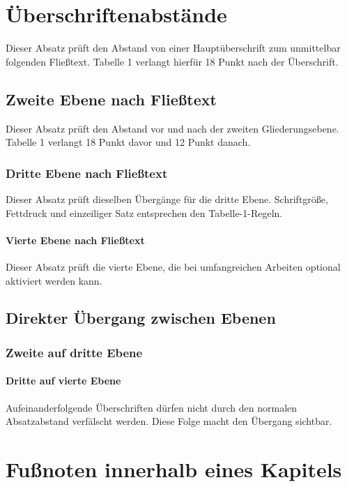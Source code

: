 \documentclass[
  12pt,
  a4paper,
  oneside,
  headings=normal,
  numbers=noendperiod,
  bibliography=totoc
]{scrreprt}
\begin{document}
\chapter{Überschriftenabstände}

Dieser Absatz prüft den Abstand von einer Hauptüberschrift zum unmittelbar
folgenden Fließtext. Tabelle 1 verlangt hierfür 18 Punkt nach der
Überschrift.

\section{Zweite Ebene nach Fließtext}

Dieser Absatz prüft den Abstand vor und nach der zweiten Gliederungsebene.
Tabelle 1 verlangt 18 Punkt davor und 12 Punkt danach.

\subsection{Dritte Ebene nach Fließtext}

Dieser Absatz prüft dieselben Übergänge für die dritte Ebene. Schriftgröße,
Fettdruck und einzeiliger Satz entsprechen den Tabelle-1-Regeln.

\subsubsection{Vierte Ebene nach Fließtext}

Dieser Absatz prüft die vierte Ebene, die bei umfangreichen Arbeiten optional
aktiviert werden kann.

\section{Direkter Übergang zwischen Ebenen}
\subsection{Zweite auf dritte Ebene}
\subsubsection{Dritte auf vierte Ebene}

Aufeinanderfolgende Überschriften dürfen nicht durch den normalen
Absatzabstand verfälscht werden. Diese Folge macht den Übergang sichtbar.

\chapter{Fußnoten innerhalb eines Kapitels}
\end{document}
